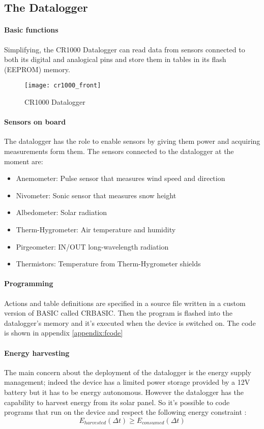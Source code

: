 \subsection{The Datalogger}
\paragraph{Basic functions \cite{cmp1}}
Simplifying, the CR1000 Datalogger can read data from sensors connected to both its digital and analogical pins and store them in tables in its flash (EEPROM) memory.
\begin{figure}
	\centering
	\texttt{[image: cr1000\_front]}
	\caption{CR1000 Datalogger}
	\label{fig:cr1000}
\end{figure}
\paragraph{Sensors on board \cite{avv1}}
The datalogger has the role to enable sensors by giving them power and acquiring measurements form them. The sensors connected to the datalogger at the moment are:
\begin{itemize}
    \item Anemometer: Pulse sensor that measures wind speed and direction
    \item Nivometer: Sonic sensor that measures snow height
    \item Albedometer: Solar radiation
    \item Therm-Hygrometer: Air temperature and humidity
    \item Pirgeometer: IN/OUT long-wavelength radiation
    \item Thermistors: Temperature from Therm-Hygrometer shields
\end{itemize}
\paragraph{Programming}
Actions and table definitions are specified in a source file written in a custom version of BASIC called CRBASIC. Then the program is flashed into the datalogger's memory and it's executed when the device is switched on. The code is shown in appendix \ref{appendix:fcode}
\paragraph{Energy harvesting}
The main concern about the deployment of the datalogger is the energy supply management; indeed the device has a limited power storage provided by a 12V battery but it has to be energy autonomous. However the datalogger has the capability to harvest energy from its solar panel. So it's possible to code programs that run on the device and respect the following energy constraint \cite{avv1}:
\begin{equation}
    E_{harvested}(\Delta t) \geq E_{consumed}(\Delta t)
\end{equation}